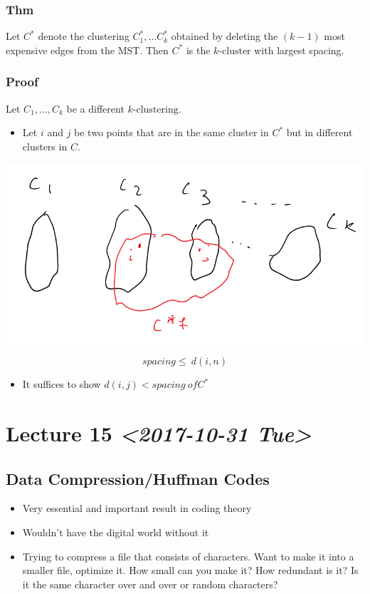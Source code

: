 \documentclass[11pt]{article}
\begin{document}
\subsubsection{Thm}
\label{sec:org5902a11}
Let \(C^{*}\) denote the clustering \(C_1^*,\ldots C_k^{*}\) obtained by deleting the \((k-1)\) most expensive edges from the MST. Then \(C^{*}\) is the \(k\text{-cluster}\) with largest spacing.
\subsubsection{Proof}
\label{sec:orgb2e4fdf}
Let \(C_1,\ldots,C_k\) be a different \(k\text{-clustering}\).
\begin{itemize}
\item Let \(i\) and \(j\) be two points that are in the same cluster in  \(C^{*}\) but in different clusters in \(C\).
\end{itemize}
\begin{center}
\includegraphics[width=.9\linewidth]{./Images/i59.png}
\end{center}
$$spacing \leq \ d(i,n)$$
\begin{itemize}
\item It suffices to show \(d(i,j)<spacing  \ of C^*\)
\end{itemize}
\section{Lecture 15 \textit{<2017-10-31 Tue>}}
\label{sec:orgfc4a416}
\subsection{Data Compression/Huffman Codes}
\label{sec:org09bf386}
\begin{itemize}
\item Very essential and important result in coding theory
\item Wouldn't have the digital world without it
\item Trying to compress a file that consists of characters. Want to make it into a smaller file, optimize it. How small can you make it? How redundant is it? Is it the same character over and over or random characters?
\end{itemize}
\end{document}
